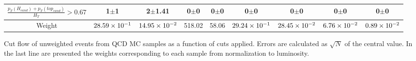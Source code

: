 \begin{frame}{}
\begin{table}[htbH]
\begin{center}
{\begin{tabular}{|c|c|c|c|c|c|c|c|c|}
$\frac{p_{T}(H_{cand})+p_{T}(top_{cand})}{H_{T}} > 0.67 $ & 1$\pm$1 & 2$\pm$1.41 & 0$\pm$0 & 0$\pm$0 & 0$\pm$0 & 0$\pm$0 & 0$\pm$0 & 0$\pm$0 \\
\hline
Weight & $28.59\times 10^{-1}$ & $14.95\times 10^{-2}$ & 518.02 & 58.06 & $29.24\times 10^{-1}$ & $28.45\times 10^{-2}$ & $6.76\times 10^{-2}$ & $0.89\times 10^{-2}$ \\
\hline
\end{tabular}
}
\end{center}
\end{table}

\vspace{-.2cm}
    \begin{block}{}
      \tiny \centering Cut flow of unweighted events from QCD MC samples as a function of cuts applied. Errors are calculated as $\sqrt{N}$ of the central value. In the last line are presented the weights corresponding to each sample from normalization to luminosity.
    \end{block}

\end{frame}

